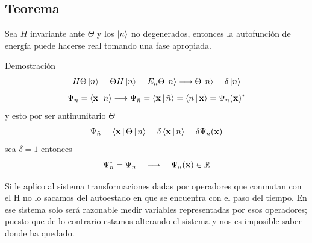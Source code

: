 \documentclass[10pt,oneside]{CBFT_book}
\begin{document}
\subsection{Teorema}

Sea $H$ invariante ante $\Theta$ y los $\Ket{n}$ no degenerados, entonces la autofunción de energía puede 
hacerse real tomando una fase apropiada.

Demostración 
\[
	H\Theta\Ket{n} = \Theta H \Ket{n} = E_n \Theta \Ket{n} \longrightarrow \Theta \Ket{n} = \delta\Ket{n}
\]
\[
	\Psi_n = \Braket{\vb{x}|n} \longrightarrow \Psi_{\tilde{n}} = \Braket{\vb{x}|\tilde{n}} =
	\Braket{n|\vb{x}} = \Psi_n (\vb{x})^*
\]
y esto por ser antinunitario $\Theta$
\[
	\Psi_{\tilde{n}} = \Braket{\vb{x}|\Theta|n} = \delta\Braket{\vb{x}|n} = \delta\Psi_n(\vb{x})
\]
sea $\delta = 1 $ entonces 
\[
	\Psi_n^* = \Psi_n \quad \longrightarrow \quad \Psi_n(\vb{x}) \in \mathbb{R} 
\]

Si le aplico al sistema transformaciones dadas por operadores que conmutan con el H no lo sacamos del 
autoestado en que se encuentra con el paso del tiempo.
En ese sistema solo será razonable medir variables representadas por esos operadores; puesto que de lo 
contrario estamos alterando el sistema y nos es imposible saber donde ha quedado.



\end{document}
